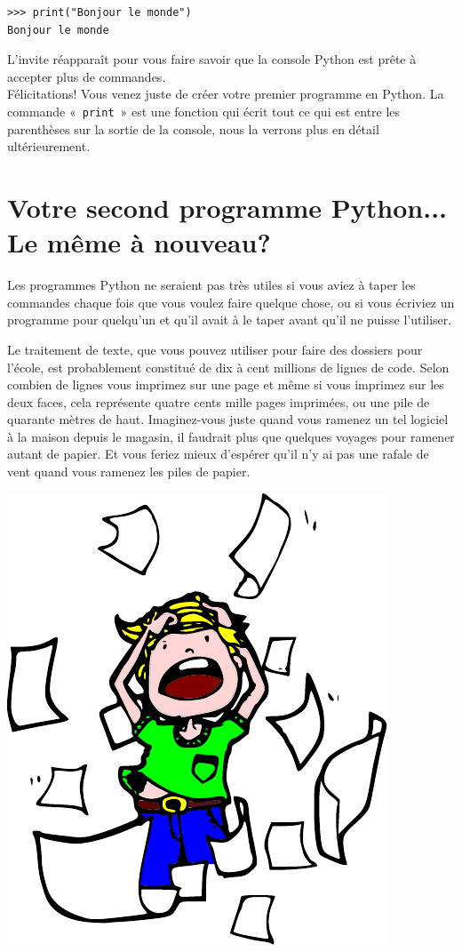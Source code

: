 \begin{Verbatim}[frame=single,rulecolor=\color{mbleu}, label=à taper si cela n'est pas déjà fait]
>>> print("Bonjour le monde")
Bonjour le monde
\end{Verbatim}


L'invite réapparaît pour vous faire savoir que la console Python est prête à accepter plus de commandes.\\


Félicitations! Vous venez juste de créer votre premier programme en Python. La commande «~\verb+print+~» est une fonction qui écrit tout ce qui est entre les parenthèses sur la sortie de la console, nous la verrons plus en détail ultérieurement.

\section{Votre second programme Python... Le même à nouveau?}

Les programmes Python ne seraient pas très utiles si vous aviez à taper les commandes chaque fois que vous voulez faire quelque chose, ou si vous écriviez un programme pour quel\-qu'un et qu'il avait à le taper avant qu'il ne puisse l'utiliser.

Le traitement de texte, que vous pouvez utiliser pour faire des dossiers pour l'école, est probablement constitué de dix à cent millions de lignes de code. Selon combien de lignes vous imprimez sur une page et même si vous imprimez sur les deux faces, cela représente quatre cents mille pages imprimées, ou une pile de quarante mètres de haut. Imaginez-vous juste quand vous ramenez un tel logiciel à la maison depuis le magasin, il faudrait plus que quelques voyages pour ramener autant de papier. Et vous feriez mieux d'espérer qu'il n'y ai pas une rafale de vent quand vous ramenez les piles de papier.

\begin{center}
\includegraphics[scale=1]{images/encore.pdf} 
\end{center} 


